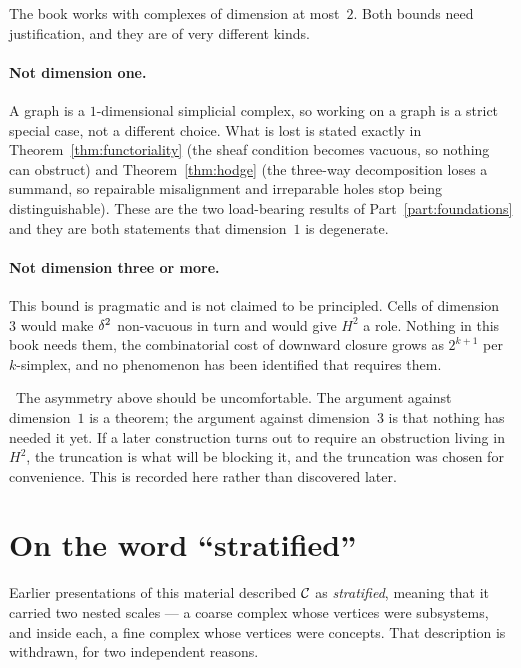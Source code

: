 The book works with complexes of dimension at most~$2$. Both bounds need
justification, and they are of very different kinds.

\paragraph{Not dimension one.} A graph is a $1$-dimensional simplicial
complex, so working on a graph is a strict special case, not a different
choice. What is lost is stated exactly in Theorem~\ref{thm:functoriality} (the
sheaf condition becomes vacuous, so nothing can obstruct) and
Theorem~\ref{thm:hodge} (the three-way decomposition loses a summand, so
repairable misalignment and irreparable holes stop being distinguishable).
These are the two load-bearing results of Part~\ref{part:foundations} and
they are both statements that dimension~$1$ is degenerate.

\paragraph{Not dimension three or more.} This bound is pragmatic and is not
claimed to be principled. Cells of dimension~$3$ would make $\delta^2$
non-vacuous in turn and would give $H^2$ a role. Nothing in this book needs
them, the combinatorial cost of downward closure grows as $2^{k+1}$ per
$k$-simplex, and no phenomenon has been identified that requires them.

\begin{hon}\Hon
\Contested\ The asymmetry above should be uncomfortable. The argument against
dimension~$1$ is a theorem; the argument against dimension~$3$ is that nothing
has needed it yet. If a later construction turns out to require an obstruction
living in $H^2$, the truncation is what will be blocking it, and the
truncation was chosen for convenience. This is recorded here rather than
discovered later.
\end{hon}

\section{On the word ``stratified''}\label{sec:stratword}

Earlier presentations of this material described $\mathcal{C}$ as \emph{stratified},
meaning that it carried two nested scales --- a coarse complex whose vertices
were subsystems, and inside each, a fine complex whose vertices were concepts.
That description is withdrawn, for two independent reasons.

